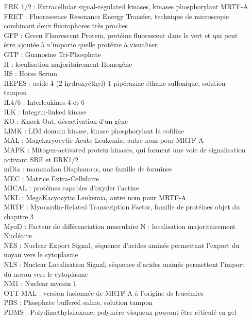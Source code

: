 ERK 1/2 : Extracellular signal-regulated kinases, kinases phosphorylant MRTF-A\\
FRET : Fluorescence Resonance Energy Transfer, technique de microscopie combinant deux fluorophores très proches\\
GFP : Green Fluorescent Protein, protéine fluorescent dans le vert et qui peut être ajoutée à n'importe quelle protéine à visualiser\\
GTP : Guanosine Tri-Phosphate\\
H : localisation majoritairement Homogène\\
HS : Horse Serum\\
HEPES :  acide 4-(2-hydroxyéthyl)-1-pipérazine éthane sulfonique, solution tampon\\
IL4/6 : Interleukines 4 et 6\\
ILK : Integrin-linked kinase\\
KO : Knock Out, désactivation d'un gène\\
LIMK : LIM domain kinase, kinase phosphorylant la cofiline\\
MAL : Magekaryocytic Acute Leukemia, autre nom pour MRTF-A\\
MAPK : Mitogen-activated protein kinases, qui forment une voie de signalisation activant SRF et ERK1/2\\
mDia : mammalian Diaphanous, une famille de formines\\
MEC : Matrice Extra-Cellulaire\\
MICAL : protéines capables d'oxyder l'actine\\
MKL : MegaKacyocytic Leukemia, autre nom pour MRTF-A\\
MRTF : Myocardin-Related Transcription Factor, famille de protéines objet du chapitre 3\\
MyoD : Facteur de différenciation musculaire
N : localisation majoritairement Nucléaire\\
NES : Nuclear Export Signal, séquence d'acides aminés permettant l'export du noyau vers le cytoplasme\\
NLS : Nuclear Localisation Signal, séquence d'acides mainés permettent l'import du noyau vers le cytoplasme\\
NM1 : Nuclear myosin 1\\
OTT-MAL : version fusionnée de MRTF-A à l'origine de leucémies\\
PBS :  Phosphate buffered saline, solution tampon\\
PDMS : Polydimethylsiloxane, polymère visqueux pouvant être réticulé en gel\\
